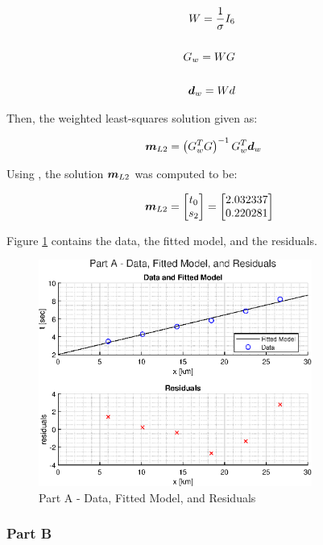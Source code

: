 \begin{align*}
	W = \frac{1}{\sigma} I_6 \\
	\\
	G_w = W G \\
	\\
	\boldsymbol{d}_w = W d
\end{align*}

Then, the weighted least-squares solution given as:

\begin{align*}
	\boldsymbol{m}_{L2} &= \left(G_w^T G \right)^{-1} G_w^T \boldsymbol{d}_{w}
\end{align*}

Using \MATLAB, the solution $\boldsymbol{m}_{L2}$ was computed to be:

\begin{align*}
	\boldsymbol{m}_{L2} = \begin{bmatrix} t_0 \\ s_2 \end{bmatrix} = \begin{bmatrix} \textrm{2.032337} \\ \textrm{0.220281} \end{bmatrix}
\end{align*}

Figure \ref{fig: prob1 partA} contains the data, the fitted model, and the residuals.

\begin{figure}[h] 
	\centering
	\includegraphics[width=0.8\textwidth]{./images/prob1_partA.eps}
	\caption{Part A - Data, Fitted Model, and Residuals}
	\label{fig: prob1 partA}
\end{figure}
\FloatBarrier


\subsubsection{Part B}

